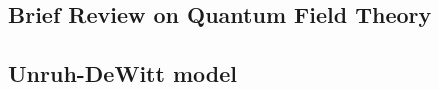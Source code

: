\documentclass[a4paper,12pt]{article}
\begin{document}
\subsection{Brief Review on Quantum Field Theory}
\subsection{Unruh-DeWitt model}
\appendix

\acknowledgments






\end{document}
